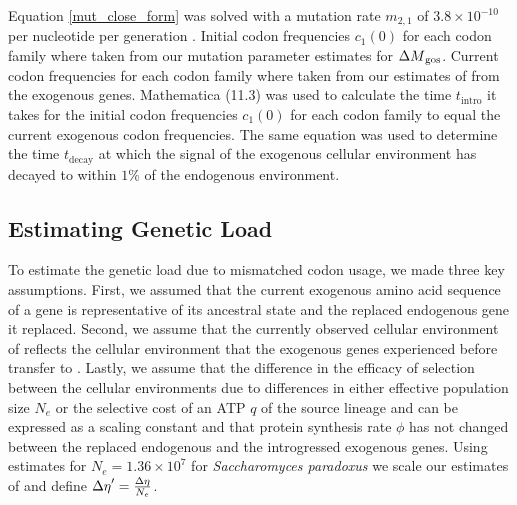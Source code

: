 Equation \ref{mut_close_form} was solved with a mutation rate $m_{2,1}$ of $3.8\times 10^{-10}$ per nucleotide per generation \citep{lang2008}. 
Initial codon frequencies $c_1(0)$ for each codon family where taken from our mutation parameter estimates for \gossypii ${\Delta M}_\text{gos}$. 
Current codon frequencies for each codon family where taken from our estimates of \DM from the exogenous genes.
Mathematica (11.3) \citep{Mathematica11} was used to calculate the time $t_\text{intro}$ it takes for the initial codon frequencies $c_1(0)$ for each codon family to equal the current exogenous codon frequencies.
The same equation was used to determine the time $t_\text{decay}$ at which the signal of the exogenous cellular environment has decayed to within $1 \%$ of the endogenous environment.

\subsection*{Estimating Genetic Load}

To estimate the genetic load due to mismatched codon usage, we made three key assumptions.
First, we assumed that the current exogenous amino acid sequence of a gene is representative of its ancestral state and the replaced endogenous gene it replaced.
Second, we assume that the currently observed cellular environment of \gossypii reflects the cellular environment that the exogenous genes experienced before transfer to \kluyveri.
Lastly, we assume that the difference in the efficacy of selection between the cellular environments due to differences in either effective population size $N_e$ or the selective cost of an ATP $q$ of the source lineage and \kluyveri can be expressed as a scaling constant and that protein synthesis rate $\phi$ has not changed between the replaced endogenous and the introgressed exogenous genes.
Using estimates for $N_e = 1.36\times10^7$ \citep{wagner2005} for \textit{Saccharomyces paradoxus} we scale our estimates of \DE and define ${\Delta \eta}' = \frac{{\Delta \eta}}{N_e}$.

